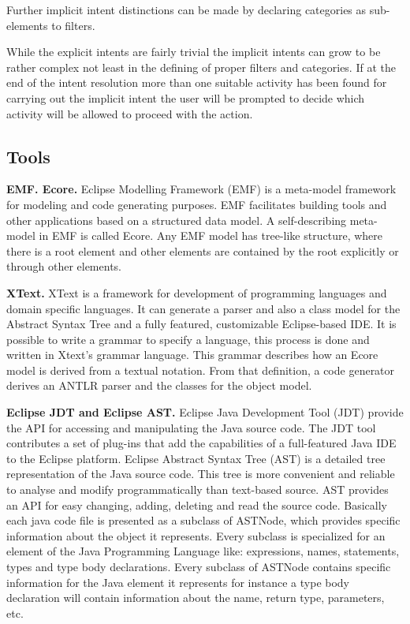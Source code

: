 Further implicit intent distinctions can be made by declaring categories as sub-elements to filters.

While the explicit intents are fairly trivial the implicit intents can grow to be rather complex not least in the defining of proper filters and categories. If at the end of the intent resolution more than one suitable activity has been found for carrying out the implicit intent the user will be prompted to decide which activity will be allowed to proceed with the action. 


\subsection{Tools}
\label{tools}
\textbf{EMF. Ecore.} Eclipse Modelling Framework (EMF) \cite{emf} is a meta-model framework for modeling and code generating purposes. EMF facilitates building tools and other applications based on a structured data model. A self-describing meta-model in EMF is called Ecore. Any EMF model has tree-like structure, where there is a root element and other elements are contained by the root explicitly or through other elements. 

\textbf{XText.} XText \cite{xtext} is a framework for development of programming languages and domain specific languages. It can generate a parser and also a class model for the Abstract Syntax Tree and a fully featured, customizable Eclipse-based IDE. It is possible to write a grammar to specify a language, this process is done and written in Xtext's grammar language. This grammar describes how an Ecore model is derived from a textual notation. From that definition, a code generator derives an ANTLR parser and the classes for the object model.

\textbf{Eclipse JDT and Eclipse AST.} Eclipse Java Development Tool (JDT) \cite{jdt} provide the API for accessing and manipulating the Java source code. The JDT tool contributes a set of plug-ins that add the capabilities of a full-featured Java IDE to the Eclipse platform. Eclipse Abstract Syntax Tree (AST) \cite{ast} is a detailed tree representation of the Java source code. This tree is more convenient and reliable to analyse and modify programmatically than text-based source. AST provides an API for easy changing, adding, deleting and read the source code. Basically each java code file is presented as a subclass of ASTNode, which provides specific information about the object it represents. Every subclass is specialized for an element of the Java Programming Language like: expressions, names, statements, types and type body declarations. Every subclass of ASTNode contains specific information for the Java element it represents for instance a type body declaration will contain information about the name, return type, parameters, etc.

